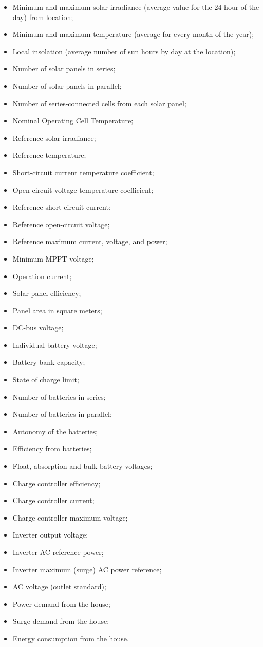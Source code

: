 \begin{itemize}
\item Minimum and maximum solar irradiance (average value for the 24-hour of the day) from location;
\item Minimum and maximum temperature (average for every month of the year);
\item Local insolation (average number of sun hours by day at the location);
\item Number of solar panels in series;
\item Number of solar panels in parallel;
\item Number of series-connected cells from each solar panel;
\item Nominal Operating Cell Temperature;
\item Reference solar irradiance;
\item Reference temperature;
\item Short-circuit current temperature coefficient;
\item Open-circuit voltage temperature coefficient;
\item Reference short-circuit current;
\item Reference open-circuit voltage;
\item Reference maximum current, voltage, and power;
\item Minimum MPPT voltage;
\item Operation current;
\item Solar panel efficiency;
\item Panel area in square meters;
\item DC-bus voltage;
\item Individual battery voltage;
\item Battery bank capacity;
\item State of charge limit;
\item Number of batteries in series;
\item Number of batteries in parallel;
\item Autonomy of the batteries;
\item Efficiency from batteries;
\item Float, absorption and bulk battery voltages;
\item Charge controller efficiency;
\item Charge controller current;
\item Charge controller maximum voltage;
\item Inverter output voltage;
\item Inverter AC reference power;
\item Inverter maximum (surge) AC power reference;
\item AC voltage (outlet standard);
\item Power demand from the house;
\item Surge demand from the house;
\item Energy consumption from the house.
\end{itemize}

